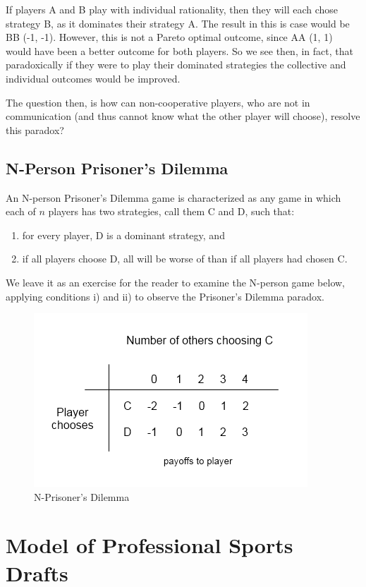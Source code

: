 \documentclass{article}
\begin{document}
If players A and B play with individual rationality, then they will each chose strategy B, as it dominates their strategy A. The result in this is case would be BB (-1, -1). However, this is not a Pareto optimal outcome, since AA (1, 1) would have been a better outcome for both players. So we see then, in fact, that paradoxically if they were to play their dominated strategies the collective and individual outcomes would be improved.

The question then, is how can non-cooperative players, who are not in communication (and thus cannot know what the other player will choose), resolve this paradox?

\subsection{N-Person Prisoner's Dilemma}

An N-person Prisoner's Dilemma game is characterized as any game in which each of $n$ players has two strategies, call them C and D, such that:

\begin{enumerate}[label=\roman{*})]
\item for every player, D is a dominant strategy, and
\item if all players choose D, all will be worse of than if all players had chosen C.
\end{enumerate}

We leave it as an exercise for the reader to examine the N-person game below, applying conditions i) and ii) to observe the Prisoner's Dilemma paradox.

\begin{figure}[H]
	\centering
	\includegraphics[scale=1.0]{NPersonDilemma}
	\caption{N-Prisoner's Dilemma}
\end{figure}

\section{Model of Professional Sports Drafts}
\end{document}
